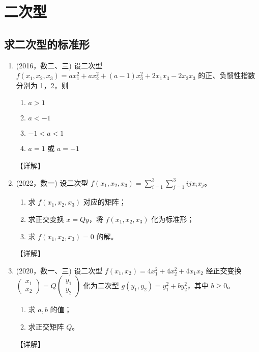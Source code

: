 \documentclass[12pt, a4paper, oneside, UTF8]{ctexbook}
\begin{document}
% 
\else
\fi
\chapter{二次型}

\section{求二次型的标准形}

\begin{enumerate}[label=\arabic*.]
    \item (2016，数二、三) 设二次型 $ f(x_1, x_2, x_3) = a x_1^2 + a x_2^2 + (a-1) x_3^2 + 2 x_1 x_3 - 2 x_2 x_3 $ 的正、负惯性指数分别为 1，2，则
    \begin{enumerate}
        \item  $ a > 1 $
        \item  $ a < -1 $
        \item  $ -1 < a < 1 $
        \item  $ a = 1 $ 或 $ a = -1 $
    \end{enumerate}
    
    \begin{solution}
    【详解】
    \end{solution}
    
    \item (2022，数一) 设二次型 $ f(x_1, x_2, x_3) = \sum_{i=1}^3 \sum_{j=1}^3 i j x_i x_j $。
    \begin{enumerate}
        \item 求 $ f(x_1, x_2, x_3) $ 对应的矩阵；
        \item 求正交变换 $ x = Q y $，将 $ f(x_1, x_2, x_3) $ 化为标准形；
        \item 求 $ f(x_1, x_2, x_3) = 0 $ 的解。
    \end{enumerate}
    
    \begin{solution}
    【详解】
    \end{solution}
    
    \item (2020，数一、三) 设二次型 $ f(x_1, x_2) = 4 x_1^2 + 4 x_2^2 + 4 x_1 x_2 $ 经正交变换 $ \begin{pmatrix} x_1 \\ x_2 \end{pmatrix} = Q \begin{pmatrix} y_1 \\ y_2 \end{pmatrix} $ 化为二次型 $ g(y_1, y_2) = y_1^2 + b y_2^2 $，其中 $ b \geq 0 $。 
    \begin{enumerate}
        \item 求 $ a, b $ 的值；
        \item 求正交矩阵 $ Q $。
    \end{enumerate}
    
    \begin{solution}
    【详解】
    \end{solution}
\end{enumerate}
\end{document}
